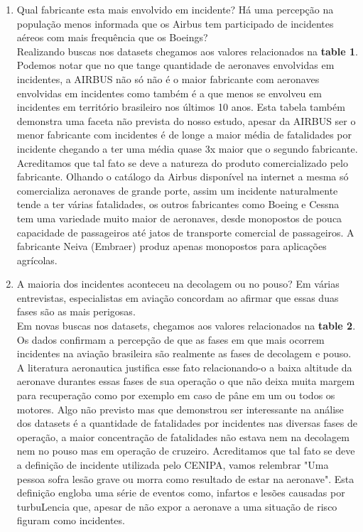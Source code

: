 \documentclass[conference]{IEEEtran}
\begin{document}
\begin{enumerate}
 \item Qual fabricante esta mais envolvido em incidente? Há uma percepção na população menos informada que os Airbus tem participado de incidentes aéreos com mais frequência
 que os Boeings?\\
 
 Realizando buscas nos datasets chegamos aos valores relacionados na \textbf{table 1}. Podemos notar que no que tange quantidade de aeronaves envolvidas em incidentes,
 a AIRBUS não só não é o maior fabricante com aeronaves envolvidas em incidentes como também é a que menos se envolveu em incidentes em território brasileiro nos últimos
 10 anos. Esta tabela também demonstra uma faceta não prevista do nosso estudo, apesar da AIRBUS ser o menor fabricante com incidentes é de longe a maior média de fatalidades 
 por incidente chegando a ter uma média quase 3x maior que o segundo fabricante. Acreditamos que tal fato se deve a natureza do produto comercializado pelo fabricante. 
 Olhando o catálogo da Airbus disponível na internet a mesma só comercializa aeronaves de grande porte, assim um incidente naturalmente tende a ter várias fatalidades,
 os outros fabricantes como Boeing e Cessna tem uma variedade muito maior de aeronaves, desde monopostos de pouca capacidade de passageiros até jatos de transporte comercial
 de passageiros. A fabricante Neiva (Embraer) produz apenas monopostos para aplicações agrícolas.\\
 
 \item A maioria dos incidentes aconteceu na decolagem ou no pouso? Em várias entrevistas, especialistas em aviação concordam ao afirmar que essas duas fases são as
 mais perigosas.\\
 
 Em novas buscas nos datasets, chegamos aos valores relacionados na \textbf{table 2}. Os dados confirmam a percepção de que as fases em que mais ocorrem incidentes na
 aviação brasileira são realmente as fases de decolagem e pouso. A literatura aeronautica justifica esse fato relacionando-o a baixa altitude da aeronave durantes essas
 fases de sua operação o que não deixa muita margem para recuperação como por exemplo em caso de pâne em um ou todos os motores. Algo não previsto mas que demonstrou ser
 interessante na análise dos datasets é a quantidade de fatalidades por incidentes nas diversas fases de operação, a maior concentração de fatalidades não estava nem na
 decolagem nem no pouso mas em operação de cruzeiro. Acreditamos que tal fato se deve a definição de incidente utilizada pelo CENIPA, vamos relembrar "Uma pessoa sofra 
 lesão grave ou morra como resultado de estar na aeronave". Esta definição engloba uma série de eventos como, infartos e lesões causadas por turbuLencia que, apesar de não
 expor a aeronave a uma situação de risco figuram como incidentes.\\
 

\end{enumerate}
\end{document}
